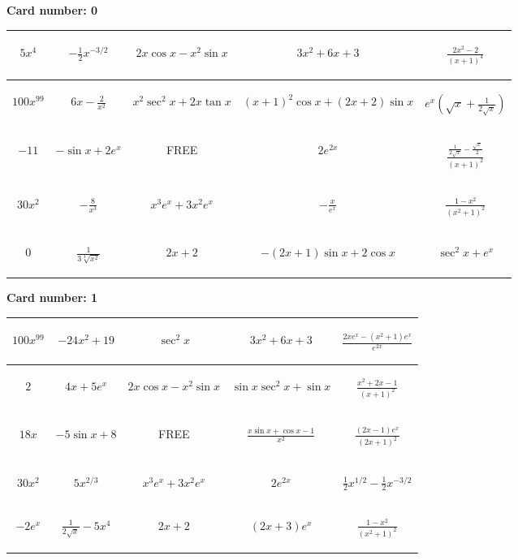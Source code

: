 \documentclass{article}
\newcommand{\entry}[1]{\begin{minipage}[t][2.75cm][t]{4cm} \vspace{1cm} \begin{center}#1\end{center} \end{minipage}}
\newcommand{\freespace}{\entry{FREE}}
\newcommand{\cardnumber}[1]{\noindent \textbf{Card number: #1} \bigskip}
\begin{document}
\renewcommand{\arraystretch}{2}


\cardnumber{0}
\begin{center}
\begin{tabular}{|*{5}{c|}}
    \hline
    \entry{$5x^4$} & \entry{$-\frac{1}{2} x^{-3/2}$} & \entry{$2x \cos x - x^2 \sin x$} & \entry{$3x^2 + 6x + 3$} & \entry{$\frac{2x^2 - 2}{(x + 1)^4}$} \\ \hline
    \entry{$100x^{99}$} & \entry{$6x - \frac{2}{x^2}$} & \entry{$x^2 \sec^2 x + 2x \tan x$} & \entry{$(x + 1)^2 \cos x + (2x + 2) \sin x$} & \entry{$e^x \left(\sqrt{x} + \frac{1}{2\sqrt{x}}\right)$} \\ \hline
    \entry{$-11$} & \entry{$-\sin x + 2e^x$} & \freespace & \entry{$2e^{2x}$} & \entry{$\frac{\frac{1}{2 \sqrt{x}} - \frac{\sqrt{x}}{2}}{(x + 1)^2}$} \\ \hline
    \entry{$30x^2$} & \entry{$-\frac{8}{x^3}$} & \entry{$x^3 e^x + 3x^2 e^x$} & \entry{$-\frac{x}{e^x}$} & \entry{$\frac{1 - x^2}{(x^2 + 1)^2}$} \\ \hline
    \entry{$0$} & \entry{$\frac{1}{3\sqrt[3]{x^2}}$} & \entry{$2x + 2$} & \entry{$-(2x + 1) \sin x + 2 \cos x$} & \entry{$\sec^2 x + e^x$} \\ \hline
\end{tabular}
\end{center}

\pagebreak

\cardnumber{1}
\begin{center}
\begin{tabular}{|*{5}{c|}}
    \hline
    \entry{$100x^{99}$} & \entry{$-24x^2 + 19$} & \entry{$\sec^2 x$} & \entry{$3x^2 + 6x + 3$} & \entry{$\frac{2x e^x - (x^2 + 1) e^x}{e^{2x}}$} \\ \hline
    \entry{$2$} & \entry{$4x + 5e^x$} & \entry{$2x \cos x - x^2 \sin x$} & \entry{$\sin x \sec^2 x + \sin x$} & \entry{$\frac{x^2 + 2x - 1}{(x + 1)^2}$} \\ \hline
    \entry{$18x$} & \entry{$-5 \sin x + 8$} & \freespace & \entry{$\frac{x \sin x + \cos x - 1}{x^2}$} & \entry{$\frac{(2x - 1) e^x}{(2x + 1)^2}$} \\ \hline
    \entry{$30x^2$} & \entry{$5x^{2/3}$} & \entry{$x^3 e^x + 3x^2 e^x$} & \entry{$2e^{2x}$} & \entry{$\frac{1}{2} x^{1/2} - \frac{1}{2} x^{-3/2}$} \\ \hline
    \entry{$-2e^x$} & \entry{$\frac{1}{2\sqrt{x}} - 5x^4$} & \entry{$2x + 2$} & \entry{$(2x + 3) e^x$} & \entry{$\frac{1 - x^2}{(x^2 + 1)^2}$} \\ \hline
\end{tabular}
\end{center}
\end{document}
